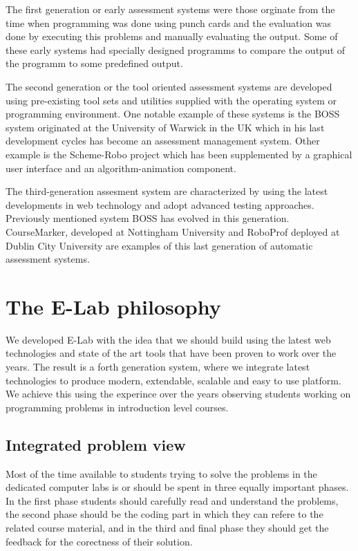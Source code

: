 \documentclass{article}
\begin{document}
The first generation or early assessment systems were
those orginate from the time when programming was done using punch cards and the
evaluation was done by executing this problems and manually evaluating the
output. Some of these early systems had specially designed programms to
compare the output of the programm to some predefined output. 

The second generation or the tool oriented assessment systems are developed
using pre-existing tool sets and utilities supplied with the operating system or
programming environment. One notable example of these systems is the BOSS
system originated at the University of Warwick in the UK \cite{joy2005boss} which in
his last development cycles has become an assessment management system. Other
example is the Scheme-Robo project \cite{saikkonen2001fully} which has been
supplemented by a graphical user interface and an algorithm-animation component.

The third-generation assesment system are characterized by using the latest
developments in web technology and adopt advanced testing approaches. Previously
mentioned system BOSS has evolved in this generation. CourseMarker, developed at
Nottingham University \cite{higgins2003coursemarker} and RoboProf deployed at
Dublin City University \cite{daly2004automated} are examples of this last
generation of automatic assessment systems.

\section{The E-Lab philosophy}

We developed E-Lab with the idea that we should build using the latest web
technologies and state of the art tools that have been proven to work over the
years. The result is a forth generation system, where we integrate latest
technologies to produce modern, extendable, scalable and easy to use platform.
We achieve this using the experince over the years observing students working on
programming problems in introduction level courses. 

\subsection{Integrated problem view}

Most of the time available to students trying to solve the problems in the
dedicated computer labs is or should be spent in three equally important phases.
In the first phase students should carefully read and understand the problems,
the second phase should be the coding part in which they can refere to the
related course material, and in the third and final phase they should get the
feedback for the corectness of their solution.
\end{document}

